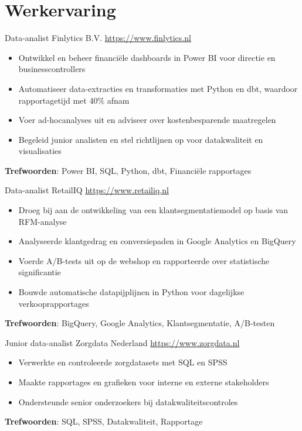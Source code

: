 \documentclass[a4paper, serif, 10pt]{moderncv}
\begin{document}
\section{Werkervaring}

        {Data-analist}
        {Finlytics B.V.}
        {\url{https://www.finlytics.nl}}
        {}
        {\begin{itemize}
\item Ontwikkel en beheer financiële dashboards in Power BI voor directie en businesscontrollers
\item Automatiseer data-extracties en transformaties met Python en dbt, waardoor rapportagetijd met 40\% afnam
\item Voer ad-hocanalyses uit en adviseer over kostenbesparende maatregelen
\item Begeleid junior analisten en stel richtlijnen op voor datakwaliteit en visualisaties
\end{itemize}
\textbf{Trefwoorden}: Power BI, SQL, Python, dbt, Financiële rapportages}

        {Data-analist}
        {RetailIQ}
        {\url{https://www.retailiq.nl}}
        {}
        {\begin{itemize}
\item Droeg bij aan de ontwikkeling van een klantsegmentatiemodel op basis van RFM-analyse
\item Analyseerde klantgedrag en conversiepaden in Google Analytics en BigQuery
\item Voerde A/B-tests uit op de webshop en rapporteerde over statistische significantie
\item Bouwde automatische datapijplijnen in Python voor dagelijkse verkooprapportages
\end{itemize}
\textbf{Trefwoorden}: BigQuery, Google Analytics, Klantsegmentatie, A/B-testen}

        {Junior data-analist}
        {Zorgdata Nederland}
        {\url{https://www.zorgdata.nl}}
        {}
        {\begin{itemize}
\item Verwerkte en controleerde zorgdatasets met SQL en SPSS
\item Maakte rapportages en grafieken voor interne en externe stakeholders
\item Ondersteunde senior onderzoekers bij datakwaliteitscontroles
\end{itemize}
\textbf{Trefwoorden}: SQL, SPSS, Datakwaliteit, Rapportage}
\end{document}
